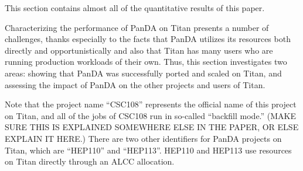 
%
%

This section contains almost all of the quantitative results of this paper.

%


Characterizing the performance of PanDA on Titan presents a number of
challenges, thanks especially to the facts that PanDA utilizes its resources
both directly and opportunistically and also that Titan has many users who are
running production workloads of their own. Thus, this section investigates two
areas: showing that PanDA was successfully ported and scaled on Titan, and
assessing the impact of PanDA on the other projects and users of Titan.

Note that the project name ``CSC108'' represents the official name of this
project on Titan, and all of the jobs of CSC108 run in so-called ``backfill
mode.'' (MAKE SURE THIS IS EXPLAINED SOMEWHERE ELSE IN THE PAPER, OR ELSE
EXPLAIN IT HERE.) There are two other identifiers for PanDA projects on Titan,
which are ``HEP110'' and ``HEP113''. HEP110 and HEP113 use resources on Titan
directly through an ALCC allocation.

%
%
%
%
%

